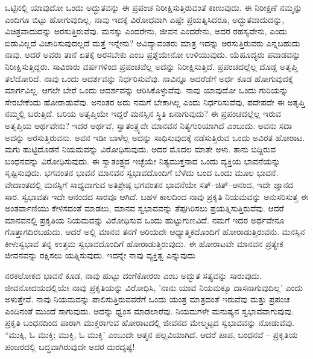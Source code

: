 ಒಟ್ಟಿನಲ್ಲಿ ಯಾವುದೋ ಒಂದು ಅದ್ಭುತವನ್ನು ಈ ಪ್ರಪಂಚ ನಿರೀಕ್ಷಿಸುತ್ತಿರುವಂತೆ ಕಾಣುವುದು. ಈ ನಿರೀಕ್ಷಣೆ ನಮ್ಮನ್ನು ಎಂದಿಗೂ ಬಿಟ್ಟು ಹೋಗುವುದಿಲ್ಲ. ನಾವು ಇದಕ್ಕೆ ವಿರೋಧವಾಗಿ ಎಷ್ಟೇ ಪ್ರಯತ್ನಿಸಿದರೂ, ಅದ್ಭುತವಾದುದನ್ನು, ವಿಚಿತ್ರವಾದುದನ್ನು ಅರಸುತ್ತಿರುವೆವು. ಮನಸ್ಸು ಎಂದರೇನು, ಜೀವನ ಎಂದರೇನು, ಅದರ ರಹಸ್ಯವೇನು, ಎಂದು ಬಿಡುವಿಲ್ಲದೆ ವಿಚಾರಿಸುವುದಲ್ಲದೆ ಮತ್ತೆ ಇನ್ನೇನು? ಅವಿದ್ಯಾವಂತರು ಮಾತ್ರ ಇದನ್ನು ಅರಸುತ್ತಿರುವರು ಎನ್ನಬಹುದು ನಾವು. ಆದರೆ ಅವರು ತಾನೆ ಏತಕ್ಕೆ ಅರಸಬೇಕು ಎಂಬ ಪ್ರಶ್ನೆಯೇನೋ ಉಳಿಯುವುದು. ಯೆಹೂದ್ಯರು ಪವಾಡವನ್ನು ನಿರೀಕ್ಷಿಸುತ್ತಿದ್ದರು. ಸಾವಿರಾರು ವರ್ಷಗಳಿಂದ ಪ್ರಪಂಚವೆಲ್ಲ ಅದನ್ನು ನಿರೀಕ್ಷಿಸುತ್ತಿದೆ. ಪ್ರಪಂಚದಲ್ಲೆಲ್ಲ ದೊಡ್ಡ ಅತೃಪ್ತಿ ತಲೆದೋರಿದೆ. ನಾವು ಒಂದು ಆದರ್ಶವನ್ನು ನಿರ್ಧರಿಸುವೆವು. ನಾವಿನ್ನೂ ಅದರೆಡೆಗೆ ಅರ್ಧ ಕೂಡ ಹೋಗುವುದಕ್ಕೆ ಮಾರ್ಗವಿಲ್ಲ. ಆಗಲೇ ಬೇರೆ ಒಂದು ಆದರ್ಶವನ್ನು ಆರಿಸಿಕೊಳ್ಳುವೆವು. ನಾವು ಯಾವುದೋ ಒಂದು ಗುರಿಯನ್ನು ಸೇರಬೇಕೆಂದು ಹೋರಾಡುವೆವು. ಅನಂತರ ಅದು ನಮಗೆ ಬೇಕಾಗಿಲ್ಲ ಎಂದು ನಿರ್ಧರಿಸುವೆವು, ಪದೇಪದೇ ಈ ಅತೃಪ್ತಿ ನಮ್ಮಲ್ಲಿ ಬರುತ್ತಿದೆ. ಬರಿಯ ಅತೃಪ್ತಿಯೇ ಇದ್ದರೆ ಮನಸ್ಸಿನ ಸ್ಥಿತಿ ಏನಾಗುವುದು? ಈ ಪ್ರಪಂಚದಲ್ಲೆಲ್ಲ ಇರುವ ಅತೃಪ್ತಿಯ ಅರ್ಥವೇನು? ಇದರ ಅರ್ಥವೆ, ಸ್ವಾತಂತ್ರ್ಯವೇ ಮಾನವನ ನಿತ್ಯಗುರಿಯಾಗಿದೆ ಎಂಬುದು. ಅವನು ಸದಾ ಅದನ್ನು ಅರಸುತ್ತಿರುವನು. ಅವನ ಇಡೀ ಬಾಳೆಲ್ಲ ಅದನ್ನು ಸಾಧಿಸುವುದಕ್ಕೆ ನಡೆಸುತ್ತಿರುವ ಒಂದು ಅವಿರತ ಹೋರಾಟ. ಮಗು ಹುಟ್ಟಿದೊಡನೆ ನಿಯಮವನ್ನು ವಿರೋಧಿಸುವುದು. ಅದರ ಮೊದಲ ಮಾತೇ ಅಳು. ತಾನು ಬಿದ್ದಿರುವ ಬಂಧನವನ್ನು ವಿರೋಧಿಸುವುದು. ಈ ಸ್ವಾತಂತ್ರ್ಯದ ಇಚ್ಛೆಯೇ ನಿತ್ಯಮುಕ್ತನಾದ ಒಂದು ವ್ಯಕ್ತಿಯ ಭಾವನೆಯನ್ನು ಸೃಷ್ಟಿಸುವುದು. ಭಗವಂತನ ಭಾವನೆ ಮಾನವನ ಸ್ವಭಾವದೊಂದಿಗೆ ಬೆಳೆದು ಬಂದ ಒಂದು ಮೂಲ ಭಾವನೆ. ವೇದಾಂತದಲ್ಲಿ ಮನಸ್ಸಿಗೆ ಸಾಧ್ಯವಾಗುವ ಅತಿಶ್ರೇಷ್ಠ ಭಗವಂತನ ಭಾವನೆಯೇ ಸತ್–ಚಿತ್–ಆನಂದ, ಇದೇ ಜ್ಞಾನದ ಸಾರ. ಸ್ವಭಾವತಃ ಇದೇ ಆನಂದದ ಸಾರವೂ ಆಗಿದೆ. ಬಹಳ ಕಾಲದಿಂದ ನಾವು ಪ್ರಕೃತಿ ನಿಯಮವನ್ನು ಅನುಸರಿಸುತ್ತ ಈ ಅಂತರ್ವಾಣಿಯು ಕೇಳಿಸದಂತೆ ಮಾಡಲು, ಮಾನವ ಸ್ವಭಾವವನ್ನು ತೆಪ್ಪಗಿರಿಸಲು ಪ್ರಯತ್ನಿಸುತ್ತಿರುವೆವು. ಆದರೆ ಮಾನವನಲ್ಲಿ ಪ್ರಕೃತಿಯ ನಿಯಮವನ್ನು ವಿರೋಧಿಸುವ ಒಂದು ಹುಟ್ಟುಗುಣವಿದೆ. ನಮಗೆ ಇದರ ಅರ್ಥವೇನೂ ಗೊತ್ತಾಗದಿರಬಹುದು. ಆದರೆ ಅಲ್ಲಿ ಮಾನವ ತನಗೆ ಅರಿಯದೇ ಆಧ್ಯಾತ್ಮಿಕದೊಂದಿಗೆ ಹೋರಾಡುತ್ತಿರುವನು. ಮನಸ್ಸಿನ ಕೀಳುಸ್ವಭಾವ ತನ್ನ ಉತ್ತಮ ಸ್ವಭಾವದೊಂದಿಗೆ ಹೋರಾಡುತ್ತಿರುವುದು. ಈ ಹೋರಾಟವೇ ಮಾನವನ ಪ್ರತ್ಯೇಕ ಜೀವನವನ್ನು ರಕ್ಷಿಸಲು ಯತ್ನಿಸುವುದು. ಇದನ್ನೇ ನಾವು ವ್ಯಕ್ತಿತ್ವ ಎನ್ನುವುದು

ನರಕಲೋಕದ ಭಾವನೆ ಕೂಡ, ನಾವು ಹುಟ್ಟು ದಂಗೆಕೋರರು ಎಂಬ ಅದ್ಭುತ ಸತ್ಯವನ್ನು ಸಾರುವುದು. ಜೀವನೋದಯದಲ್ಲಿಯೇ ನಾವು ಪ್ರಕೃತಿಯನ್ನು ವಿರೋಧಿಸಿ, 'ನಾನು ಯಾವ ನಿಯಮಕ್ಕೂ ದಾಸನಾಗುವುದಿಲ್ಲ' ಎಂದು ಅಳುತ್ತೇವೆ. ನಾವು ನಿಯಮವನ್ನು ಪಾಲಿಸುತ್ತಿರುವವರೆಗೆ ಒಂದು ಯಂತ್ರ ಮಾತ್ರದಂತೆ ಇರುವೆವು ಮತ್ತು ಪ್ರಪಂಚ ಎಂದಿನಂತೆ ಮುಂದೆ ಸಾಗುವುದು. ಅದನ್ನು ಧ್ವಂಸ ಮಾಡಲಾರೆವು. ನಿಯಮಗಳೇ ಮನುಷ್ಯನ ಸ್ವಭಾವವಾಗುವುವು. ಪ್ರಕೃತಿ ಬಂಧನದಿಂದ ಪಾರಾಗಿ ಮುಕ್ತರಾಗುವ ಹೋರಾಟದಲ್ಲಿ ಜೀವನದ ಮೇಲ್ಮಟ್ಟದ ಸ್ವಭಾವವನ್ನು ನೋಡುವೆವು. “ಮುಕ್ಕಿ, ಓ ಮುಕ್ತಿ; ಮುಕ್ತಿ, ಓ ಮುಕ್ತಿ' ಎಂಬುದೇ ಆತ್ಮನ ಪಲ್ಲವಿಯಾಗಿದೆ. ಆದರೆ ಪಾಪ, ಬಂಧನವೆ – ಪ್ರಕೃತಿಯ ಪಂಜರದಲ್ಲಿ ಬದ್ಧವಾಗಿರುವುದೇ ಅದರ ದುರದೃಷ್ಟ!

